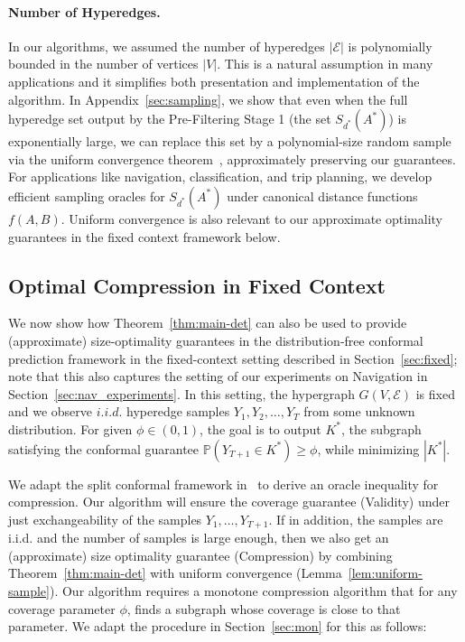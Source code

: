 \paragraph{Number of Hyperedges.}
\label{sec:poly-m-remark}
In our algorithms, we assumed the number of hyperedges \(|\mathcal{E}|\) is polynomially bounded in the number of vertices \(|V|\).  This is a natural assumption in many applications and it simplifies both presentation and implementation of the algorithm.  In Appendix~\ref{sec:sampling}, we show that even when the full hyperedge set output by the Pre-Filtering Stage 1 (the set $S_{d^*}(A^*)$) is exponentially large, we can replace this set by a polynomial-size random sample via the uniform convergence theorem~\cite{vapnik}, approximately preserving our guarantees.  
For applications like navigation, classification, and trip planning, we develop efficient sampling oracles for $S_{d^*}(A^*)$ under canonical distance functions $f(A,B)$. Uniform convergence is also relevant to our approximate optimality guarantees in the fixed context framework  below.

\subsection{Optimal Compression in Fixed Context}
\label{sec:fixed_optimal}
We now show how Theorem~\ref{thm:main-det} can also be used to provide (approximate) size-optimality guarantees in the distribution-free conformal prediction framework in the fixed-context setting described in Section~\ref{sec:fixed}; note that this also captures the setting of our experiments on Navigation in Section~\ref{sec:nav_experiments}. In this setting, the hypergraph $G(V,\mathcal E)$ is fixed and we observe $i.i.d.$ hyperedge samples $Y_1,Y_2,\ldots,Y_T$ from some unknown distribution. For given $\phi \in (0,1)$, the goal is to output $K^*$, the subgraph satisfying the conformal guarantee $\mathbb{P}(Y_{T+1} \in K^*) \ge \phi$, while minimizing $|K^*|$. 

We adapt the split conformal framework in~\cite{gao2025volume} to derive an oracle inequality for compression. 
Our algorithm will ensure the coverage guarantee (Validity) under just exchangeability of the samples $Y_1, \dots, Y_{T+1}$. If in addition, the samples are i.i.d. and the number of samples is large enough, then we also get an (approximate) size optimality guarantee (Compression) by combining Theorem~\ref{thm:main-det} with uniform convergence (Lemma~\ref{lem:uniform-sample}).  Our algorithm requires a monotone compression algorithm that for any coverage parameter $\phi$, finds a subgraph whose coverage is close to that parameter. We adapt the procedure in Section~\ref{sec:mon} for this as follows: 

